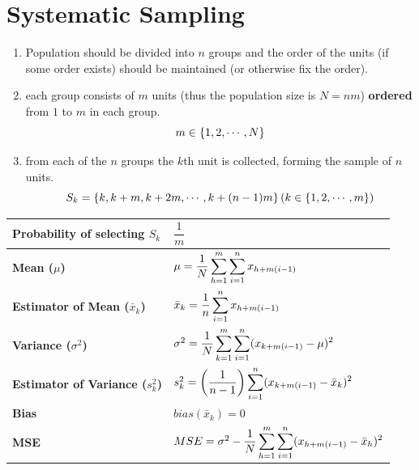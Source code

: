 \section{Systematic Sampling \cite{ism-1}}\label{Systematic Sampling}

\begin{enumerate}
    \item Population should be divided into $n$ groups and the order of the units (if some order exists) should be maintained (or otherwise fix the order).

    \item each group consists of $m$ units (thus the population size is $N = nm$) \textbf{ordered} from $1$ to $m$ in each group.
    \[
        m \in \left\{1,2,\cdots,N\right\}
    \]

    \item from each of the $n$ groups the $k$th unit is collected, forming the sample of $n$ units. 
    \[
        S_k = \dCurlyBrac{ k, k+m,k+2m,\cdots,k+(n-1)m }
        \hfill
        (k \in \dCurlyBrac{1,2,\cdots,m})
    \]
\end{enumerate}

\begin{alternateColorTable}
\begin{longtable}{|p{5cm}|p{9cm}|}
    \hline\endfirsthead
    \hline\endhead
    \hline\endfoot
    \hline\endlastfoot

    \textbf{Probability of selecting $S_k$} & $\dfrac{1}{m}$\\[1ex]
    \hline

    \textbf{Mean ($\mu$)} & $
        \mu = \dfrac{1}{N}
        \displaystyle\sum_{h=1}^{m}
        \displaystyle\sum_{i=1}^{n} 
        x_{h+m(i-1)}
    $\\[1ex]
    \hline

    \textbf{Estimator of Mean ($\bar{x}_k$)} & $
        \bar{x}_k = 
        \dfrac{1}{n} \displaystyle\sum_{i=1}^{n}
        x_{h+m(i-1)}
    $\\[1ex]
    \hline

    \textbf{Variance ($\sigma^2$)} & $
        \sigma^2 = 
        \dfrac{1}{N}
        \displaystyle\sum_{k=1}^{m}
        \displaystyle\sum_{i=1}^{n}
        (x_{k+m(i-1)} - \mu)^2
    $\\[1ex]
    \hline

    \textbf{Estimator of Variance ($s_k^2$)} & $
        s_k^2 = \left(\dfrac{1}{n-1}\right)
        \displaystyle\sum_{i=1}^{n}
        (x_{k+m(i-1)} - \bar{x}_k)^2
    $\\[1ex]
    \hline

    \textbf{Bias} & $bias(\bar{x}_k) = 0$\\
    \hline

    \textbf{MSE} & $
        MSE = \sigma^2 -
        \dfrac{1}{N}
        \displaystyle\sum_{h=1}^{m}
        \displaystyle\sum_{i=1}^{n}
        (x_{h+m(i-1)} - \bar{x}_h)^2
    $\\[1ex]
    \hline
\end{longtable}
\end{alternateColorTable}

